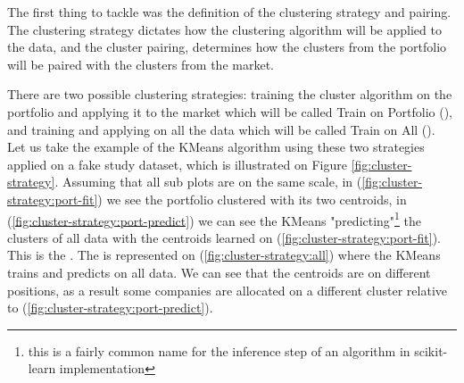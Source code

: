 The first thing to tackle was the definition of the clustering strategy and pairing. The clustering strategy dictates how the clustering algorithm will be applied to the data, and the cluster pairing, determines how the clusters from the portfolio will be paired with the clusters from the market.

There are two possible clustering strategies: training the cluster algorithm on the portfolio and applying it to the market which will be called Train on Portfolio (\nameClusterStrategyA{}), and training and applying on all the data which will be called Train on All (\nameClusterStrategyB{}). Let us take the example of the KMeans algorithm using these two strategies applied on a fake study dataset, which is illustrated on Figure \ref{fig:cluster-strategy}. Assuming that all sub plots are on the same scale, in (\ref{fig:cluster-strategy:port-fit}) we see the portfolio clustered with its two centroids, in (\ref{fig:cluster-strategy:port-predict}) we can see the KMeans "predicting"\footnote{this is a fairly common name for the inference step of an algorithm in scikit-learn implementation} the clusters of all data with the centroids learned on (\ref{fig:cluster-strategy:port-fit}). This is the \nameClusterStrategyA{}. The \nameClusterStrategyB{} is represented on (\ref{fig:cluster-strategy:all}) where the KMeans trains and predicts on all data. We can see that the centroids are on different positions, as a result some companies are allocated on a different cluster relative to (\ref{fig:cluster-strategy:port-predict}). 

